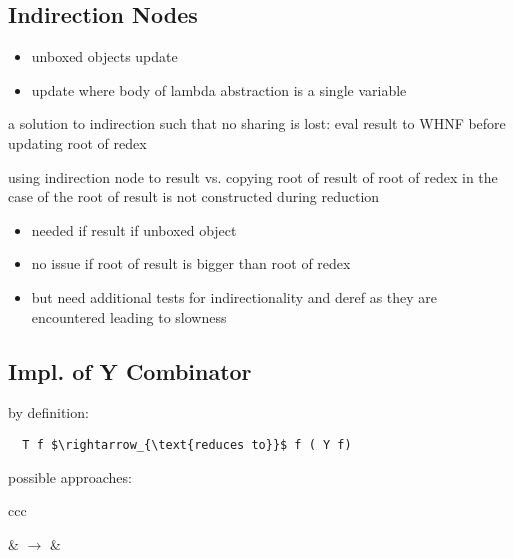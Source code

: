 \documentclass[8pt]{extarticle}
\begin{document}
\begin{multicols*}{2}
\begin{tblr}[]{}
\subsection{Indirection Nodes}

\begin{itemize}
\item unboxed objects update
\item update where body of lambda abstraction is a single variable
\end{itemize}

a solution to indirection such that no sharing is lost: eval result to WHNF before updating root of redex

using indirection node to result vs. copying root of result of root of redex in the case of the root of result is not constructed during reduction
\begin{itemize}
\item needed if result if unboxed object
\item no issue if root of result is bigger than root of redex
\item but need additional tests for indirectionality and deref as they are encountered leading to slowness
\end{itemize}

\subsection{Impl. of Y Combinator}
by definition:

\begin{lstlisting}
  T f $\rightarrow_{\text{reduces to}}$ f ( Y f)
\end{lstlisting}

possible approaches:

\begin{tblr}{ccc}
 &
$\rightarrow$ &
\end{tblr}


\end{tblr}
\end{multicols*}
\end{document}
